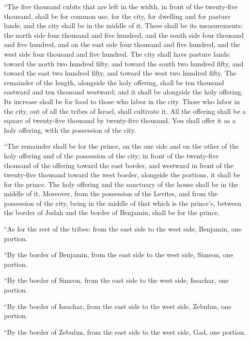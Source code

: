  ``The five thousand cubits that are left in the width,
in front of the twenty-five thousand, shall be for common use, for the
city, for dwelling and for pasture lands; and the city shall be in the
middle of it.  These shall be its measurements: the north
side four thousand and five hundred, and the south side four thousand
and five hundred, and on the east side four thousand and five hundred,
and the west side four thousand and five hundred.  The
city shall have pasture lands: toward the north two hundred fifty, and
toward the south two hundred fifty, and toward the east two hundred
fifty, and toward the west two hundred fifty.  The
remainder of the length, alongside the holy offering, shall be ten
thousand eastward and ten thousand westward; and it shall be alongside
the holy offering. Its increase shall be for food to those who labor in
the city.  Those who labor in the city, out of all the
tribes of Israel, shall cultivate it.  All the offering
shall be a square of twenty-five thousand by twenty-five thousand. You
shall offer it as a holy offering, with the possession of the city.

 ``The remainder shall be for the prince, on the one side
and on the other of the holy offering and of the possession of the city;
in front of the twenty-five thousand of the offering toward the east
border, and westward in front of the twenty-five thousand toward the
west border, alongside the portions, it shall be for the prince. The
holy offering and the sanctuary of the house shall be in the middle of
it.  Moreover, from the possession of the Levites, and
from the possession of the city, being in the middle of that which is
the prince's, between the border of Judah and the border of Benjamin,
shall be for the prince.

 ``As for the rest of the tribes: from the east side to
the west side, Benjamin, one portion.

 ``By the border of Benjamin, from the east side to the
west side, Simeon, one portion.

 ``By the border of Simeon, from the east side to the
west side, Issachar, one portion.

 ``By the border of Issachar, from the east side to the
west side, Zebulun, one portion.

 ``By the border of Zebulun, from the east side to the
west side, Gad, one portion.

